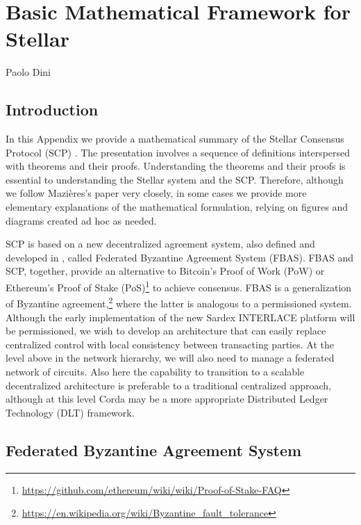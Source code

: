 \chapter*{Basic Mathematical Framework for Stellar}
\label{ch:stellar}

\vspace{-1cm}
\begin{center}
Paolo Dini
\end{center}

\section{Introduction}
In this Appendix we provide a mathematical summary of the Stellar Consensus Protocol (SCP) \cite{Mazieres2016}. The presentation involves a sequence of definitions interspersed with theorems and their proofs. Understanding the theorems and their proofs is essential to understanding the Stellar system and the SCP. Therefore, although we follow Mazi\`eres's paper \cite{Mazieres2016} very closely, in some cases we provide more elementary explanations of the mathematical formulation, relying on figures and diagrams created ad hoc as needed.

SCP is based on a new decentralized agreement system, also defined and developed in \cite{Mazieres2016}, called Federated Byzantine Agreement System (FBAS). FBAS and SCP, together, provide an alternative to Bitcoin's Proof of Work (PoW) \cite{Antonopoulos2015} or Ethereum's Proof of Stake (PoS)\footnote{\url{https://github.com/ethereum/wiki/wiki/Proof-of-Stake-FAQ}} to achieve consensus. FBAS is a generalization of Byzantine agreement,\footnote{\url{https://en.wikipedia.org/wiki/Byzantine_fault_tolerance}} where the latter is analogous to a permissioned system. Although the early implementation of the new Sardex INTERLACE platform will be permissioned, we wish to develop an architecture that can easily replace centralized control with local consistency between transacting parties. At the level above in the network hierarchy, we will also need to manage a federated network of circuits. Also here the capability to transition to a scalable decentralized architecture is preferable to a traditional centralized approach, although at this level Corda may be a more appropriate Distributed Ledger Technology (DLT) framework.

\section{Federated Byzantine Agreement System}
